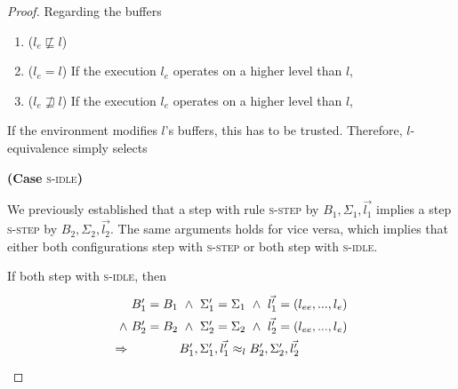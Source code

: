 \documentclass[10pt,preprint]{sigplanconf}
\newtheorem{theorem}{Theorem}
\begin{document}
\begin{proof}
Regarding the buffers

  \begin{enumerate}
    \item ($l_e \not \sqsubseteq l$) 
    \item ($l_e = l$) If the execution $l_e$ operates on a higher level than $l$, 
    \item ($l_e \not \sqsupseteq l$) If the execution $l_e$ operates on a higher level than $l$, 
  \end{enumerate}





If the environment modifies $l$'s buffers, this has to be trusted.  Therefore, $l$-equivalence simply selects 

  \textbf{(Case} \textsc{s-idle}\textbf{)}

We previously established that a step with rule \textsc{s-step} by $B_1, \Sigma_1, \vec{l_1}$ implies a step \textsc{s-step} by $B_2, \Sigma_2, \vec{l_2}$.  The same arguments holds for vice versa, which implies that either both configurations step with \textsc{s-step} or both step with \textsc{s-idle}.

If both step with \textsc{s-idle}, then
\[ \arraycolsep=1.6pt\def\arraystretch{1.5}
\begin{array}{rc}
  & B_1' = B_1 ~\wedge~\Sigma'_1 = \Sigma_1 ~\wedge~\vec{l'_1} = (l_{ee}, ..., l_e) \\
  \wedge & B_2' = B_2 ~\wedge~\Sigma'_2 = \Sigma_2 ~\wedge~\vec{l'_2} = (l_{ee}, ..., l_e) \\
  \Rightarrow & B'_1,\Sigma'_1, \vec{l'_1} \approx_l B'_2,\Sigma'_2, \vec{l'_2}
\end{array} \]
\end{proof}
\end{document}
